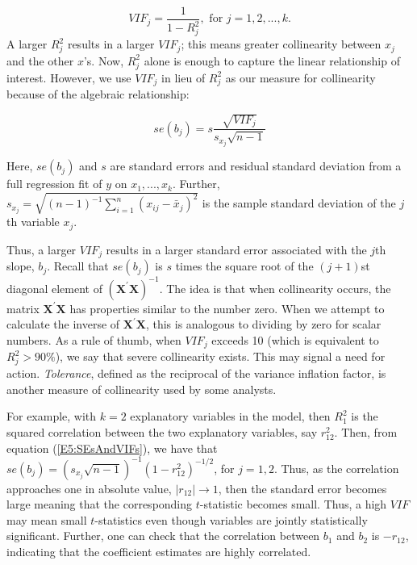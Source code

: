 \begin{equation*}
VIF_j=\frac{1}{1-R_j^2},\text{ \ \ \ for \ }j=1,2,...,k.
\end{equation*}
A larger $R_j^2$ results in a larger $VIF_j$; this means greater
collinearity between $x_j$ and the other $x$'s. Now, $R_j^2$ alone
is enough to capture the linear relationship of interest. However,
we use $VIF_j$ in lieu of $R_j^2$ as our measure for collinearity
because of the algebraic relationship:

\begin{equation} \label{E5:SEsAndVIFs}
se(b_j) = s \frac{\sqrt{VIF_j}}{s_{x_j}\sqrt{n-1}}
\end{equation}

\noindent Here, $se(b_j)$ and $s$ are standard errors and residual
standard deviation from a full regression fit of $y$ on
$x_1,...,x_{k}$. Further, $s_{x_j} = \sqrt{(n-1)^{-1}
\sum_{i=1}^{n}(x_{ij}-\bar{x}_j)^2 }$ is the sample standard
deviation of the $j$th variable $x_j$.

Thus, a larger $VIF_j$ results in a larger standard error associated
with the $j$th slope, $b_j$. Recall that $se(b_j)$ is $s$ times the
square root of the $(j+1)$st diagonal element of
$(\mathbf{X^{\prime} X})^{-1}$. The idea is that when collinearity
occurs, the matrix $\mathbf{X^{\prime}X}$ has properties similar to
the number zero. When we attempt to calculate the inverse of
$\mathbf{X^{\prime} X}$, this is analogous to dividing by zero for
scalar numbers. As a rule of thumb, when $VIF_j$ exceeds 10 (which
is equivalent to $R_j^2>90\%$), we say that severe collinearity
exists. This may signal a need for action. \emph{Tolerance}, defined
as the reciprocal of the variance inflation factor, is another
measure of collinearity used by some analysts.


For example, with $k=2$ explanatory variables in the model, then
$R_1^2$ is the squared correlation between the two explanatory
variables, say $r_{12}^2$. Then, from equation
(\ref{E5:SEsAndVIFs}), we have that $se(b_j) = \left( s_{x_j}
\sqrt{n-1} \right)^{-1} \left( 1-r_{12}^2\right)^{-1/2}$, for
$j=1,2$. Thus, as the correlation approaches one in absolute value,
$|r_{12}| \rightarrow 1$, then the standard error becomes large
meaning that the corresponding $t$-statistic becomes small. Thus, a
high $VIF$ may mean small $t$-statistics even though variables are
jointly statistically significant. Further, one can check that the
correlation between $b_1$ and $b_2$ is $-r_{12}$, indicating that
the coefficient estimates are highly correlated.



